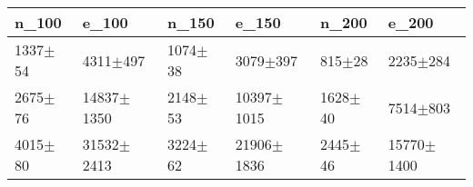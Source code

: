 \begin{tabular}{llllll}
\toprule
n_100 & e_100 & n_150 & e_150 & n_200 & e_200 \\
\midrule
1337$\pm$54 & 4311$\pm$497 & 1074$\pm$38 & 3079$\pm$397 & 815$\pm$28 & 2235$\pm$284 \\
2675$\pm$76 & 14837$\pm$1350 & 2148$\pm$53 & 10397$\pm$1015 & 1628$\pm$40 & 7514$\pm$803 \\
4015$\pm$80 & 31532$\pm$2413 & 3224$\pm$62 & 21906$\pm$1836 & 2445$\pm$46 & 15770$\pm$1400 \\
\bottomrule
\end{tabular}
